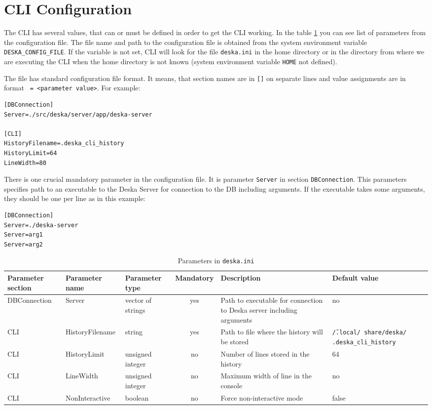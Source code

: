 \documentclass[deska]{subfiles}
\begin{document}
\section{CLI Configuration}

The CLI has several values, that can or must be defined in order to get the CLI working. In the table \ref{tab:configfile}
you can see list of parameters from the configuration file. The file name and path to the configuration file is obtained from
the system environment variable {\tt DESKA\_CONFIG\_FILE}. If the variable is not set, CLI will look for the file {\tt deska.ini}
in the home directory or in the directory from where we are executing the CLI when the home directory is not known (system
environment variable {\tt HOME} not defined).

The file has standard configuration file format. It means, that section names are in {\tt []} on separate lines and
value assignments are in format {\tt <parameter name> = <parameter value>}. For example:
\begin{verbatim}
[DBConnection]
Server=./src/deska/server/app/deska-server

[CLI]
HistoryFilename=.deska_cli_history
HistoryLimit=64
LineWidth=80
\end{verbatim}

\label{sec:cli-connection-setup}
There is one crucial mandatory parameter in the configuration file. It is parameter {\tt Server} in section
{\tt DBConnection}. This parameters specifies path to an executable to the Deska Server for connection to the DB including
arguments. If the executable takes some arguments, they should be one per line as in this example:
\begin{verbatim}
[DBConnection]
Server=./deska-server
Server=arg1
Server=arg2
\end{verbatim}

\begin{longtable}{ p{2.2cm} | l | p{1.5cm} | c | p{3.5cm} | p{2.5cm} }
    \caption{Parameters in {\tt deska.ini}} \\
    Parameter section & Parameter name & Parameter type & Mandatory & Description & Default value \\
    \hline
    \endhead
\label{tab:configfile}
    DBConnection & Server & vector of strings & yes & Path to executable for connection to Deska server including arguments & no \\
    CLI & HistoryFilename & string & yes & Path to file where the history will be stored & {\tt \~/.local/ share/deska/ .deska\_cli\_history} \\
    CLI & HistoryLimit & unsigned integer & no & Number of lines stored in the history & 64 \\
    CLI & LineWidth & unsigned integer & no & Maximum width of line in the console & no \\
    CLI & NonInteractive & boolean & no & Force non-interactive mode & false \\
    \hline
\end{longtable}
\end{document}
